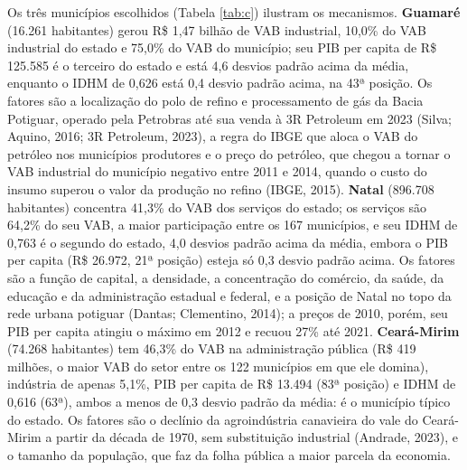 \documentclass[12pt,a4paper]{article}
\begin{document}
Os três municípios escolhidos (Tabela \ref{tab:c}) ilustram os mecanismos. \textbf{Guamaré} (16.261 habitantes) gerou R\$ 1,47 bilhão de VAB industrial, 10,0\% do VAB industrial do estado e 75,0\% do VAB do município; seu PIB per capita de R\$ 125.585 é o terceiro do estado e está 4,6 desvios padrão acima da média, enquanto o IDHM de 0,626 está 0,4 desvio padrão acima, na 43ª posição. Os fatores são a localização do polo de refino e processamento de gás da Bacia Potiguar, operado pela Petrobras até sua venda à 3R Petroleum em 2023 (Silva; Aquino, 2016; 3R Petroleum, 2023), a regra do IBGE que aloca o VAB do petróleo nos municípios produtores e o preço do petróleo, que chegou a tornar o VAB industrial do município negativo entre 2011 e 2014, quando o custo do insumo superou o valor da produção no refino (IBGE, 2015). \textbf{Natal} (896.708 habitantes) concentra 41,3\% do VAB dos serviços do estado; os serviços são 64,2\% do seu VAB, a maior participação entre os 167 municípios, e seu IDHM de 0,763 é o segundo do estado, 4,0 desvios padrão acima da média, embora o PIB per capita (R\$ 26.972, 21ª posição) esteja só 0,3 desvio padrão acima. Os fatores são a função de capital, a densidade, a concentração do comércio, da saúde, da educação e da administração estadual e federal, e a posição de Natal no topo da rede urbana potiguar (Dantas; Clementino, 2014); a preços de 2010, porém, seu PIB per capita atingiu o máximo em 2012 e recuou 27\% até 2021. \textbf{Ceará-Mirim} (74.268 habitantes) tem 46,3\% do VAB na administração pública (R\$ 419 milhões, o maior VAB do setor entre os 122 municípios em que ele domina), indústria de apenas 5,1\%, PIB per capita de R\$ 13.494 (83ª posição) e IDHM de 0,616 (63ª), ambos a menos de 0,3 desvio padrão da média: é o município típico do estado. Os fatores são o declínio da agroindústria canavieira do vale do Ceará-Mirim a partir da década de 1970, sem substituição industrial (Andrade, 2023), e o tamanho da população, que faz da folha pública a maior parcela da economia.
\end{document}
